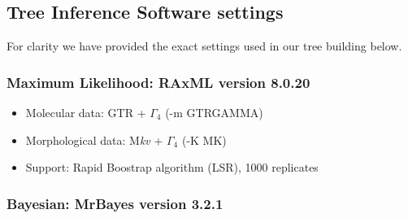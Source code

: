 \documentclass[12pt,letterpaper]{article}
\begin{document}
\newpage
\subsection{Tree Inference Software settings}

For clarity we have provided the exact settings used in our tree building below.

\subsubsection{Maximum Likelihood: RAxML version 8.0.20 \cite{Stamatakis21012014}}

\begin{itemize}
  \item Molecular data: GTR + $\Gamma_4$ (-m GTRGAMMA)
  \item Morphological data: M\textit{kv} + $\Gamma_4$ (-K MK)
  \item Support: Rapid Boostrap algorithm (LSR), 1000 replicates
\end{itemize}

\subsubsection{Bayesian: MrBayes version 3.2.1 \cite{Ronquist2012mrbayes}}
\end{document}
